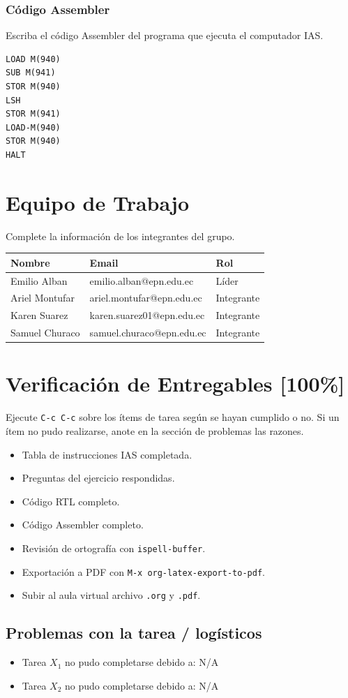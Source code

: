 \documentclass{article}
\begin{document}
\subsubsection{Código Assembler}
\label{sec:org83af939}

Escriba el código Assembler del programa que ejecuta el computador IAS.

\begin{verbatim}
LOAD M(940)
SUB M(941)
STOR M(940)
LSH
STOR M(941)
LOAD-M(940)
STOR M(940)
HALT
\end{verbatim}

\section{Equipo de Trabajo}
\label{sec:org0587745}

Complete la información de los integrantes del grupo.

\begin{center}
\begin{tabular}{lll}
\hline
Nombre & Email & Rol\\[0pt]
\hline
Emilio Alban & emilio.alban@epn.edu.ec & Líder\\[0pt]
Ariel Montufar & ariel.montufar@epn.edu.ec & Integrante\\[0pt]
Karen Suarez & karen.suarez01@epn.edu.ec & Integrante\\[0pt]
Samuel Churaco & samuel.churaco@epn.edu.ec & Integrante\\[0pt]
\hline
\end{tabular}
\end{center}

\section{Verificación de Entregables [100\%]}
\label{sec:org73862db}

Ejecute \texttt{C-c C-c} sobre los ítems de tarea según se hayan cumplido o
no. Si un ítem no pudo realizarse, anote en la sección de problemas
las razones.

\begin{itemize}
\item[{$\boxtimes$}] Tabla de instrucciones IAS completada.
\item[{$\boxtimes$}] Preguntas del ejercicio respondidas.
\item[{$\boxtimes$}] Código RTL completo.
\item[{$\boxtimes$}] Código Assembler completo.
\item[{$\boxtimes$}] Revisión de ortografía con \texttt{ispell-buffer}.
\item[{$\boxtimes$}] Exportación a PDF con \texttt{M-x org-latex-export-to-pdf}.
\item[{$\boxtimes$}] Subir al aula virtual archivo \texttt{.org} y \texttt{.pdf}.
\end{itemize}

\subsection{Problemas con la tarea / logísticos}
\label{sec:orgd3e934d}

\begin{itemize}
\item Tarea \(X_1\) no pudo completarse debido a: N/A
\item Tarea \(X_2\) no pudo completarse debido a: N/A
\end{itemize}

\printbibliography
\end{document}
